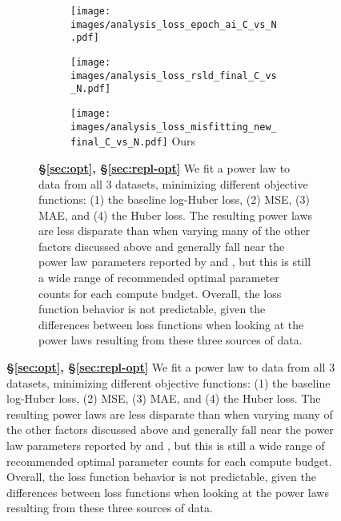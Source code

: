 \begin{figure}[]
\ContinuedFloat
\centering 


\begin{subfigure}{\textwidth}
\begin{subfigure}{0.49\textwidth}
    \centering
    \texttt{[image: images/analysis\_loss\_epoch\_ai\_C\_vs\_N.pdf]}
    \footnotesize{\citet{hoffmann2022training,besiroglu2024chinchilla}}
\end{subfigure}
\hfill
\begin{subfigure}{0.49\textwidth}
    \centering
    \texttt{[image: images/analysis\_loss\_rsld\_final\_C\_vs\_N.pdf]}
    \footnotesize{\citet{porian2024resolving}}
\end{subfigure}
\vspace{1em}
    \centering
\begin{subfigure}{0.49\textwidth}
    \centering
    \texttt{[image: images/analysis\_loss\_misfitting\_new\_final\_C\_vs\_N.pdf]}
    \footnotesize{Ours}
\end{subfigure}
\vspace{1em}
\caption{\textbf{\S\ref{sec:opt}, \S\ref{sec:repl-opt}} We fit a power law to data from all 3 datasets, minimizing different objective functions: (1) the baseline log-Huber loss, (2) MSE, (3) MAE, and (4) the Huber loss. 
The resulting power laws are less disparate than when varying many of the other factors discussed above and generally fall near the power law parameters reported by \citet{kaplan2020scaling} and \citet{hoffmann2022training}, but this is still a wide range of recommended optimal parameter counts for each compute budget. Overall, the loss function behavior is not predictable, given the differences between loss functions when looking at the power laws resulting from these three sources of data.}
\label{fig:analysis_loss}
\end{subfigure}



\end{figure}
